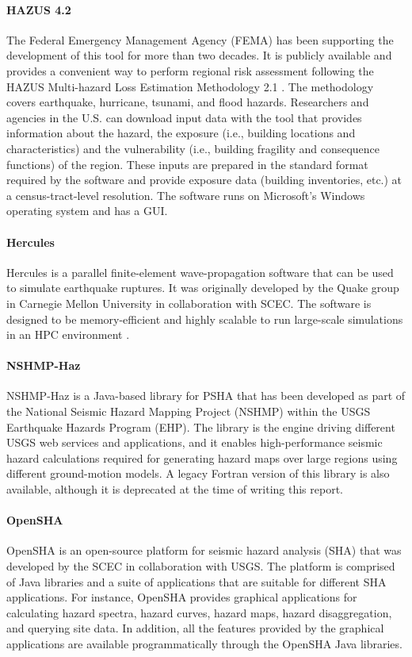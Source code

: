 \paragraph{HAZUS 4.2} The Federal Emergency Management Agency (FEMA) has been supporting the development of this tool for more than two decades. It is publicly available and provides a convenient way to perform regional risk assessment following the HAZUS Multi-hazard Loss Estimation Methodology 2.1 \citep{fema2011hurricanetechnical,fema2011earthquaketechnical,fema2011floodtechnical,fema2017tsunamitechnical}. The methodology covers earthquake, hurricane, tsunami, and flood hazards. Researchers and agencies in the U.S. can download input data with the tool that provides information about the hazard, the exposure (i.e., building locations and characteristics) and the vulnerability (i.e., building fragility and consequence functions) of the region. These inputs are prepared in the standard format required by the software and provide exposure data (building inventories, etc.) at a census-tract-level resolution. The software runs on Microsoft's Windows operating system and has a GUI.

\paragraph{Hercules} Hercules \citep{tu2006mesh} is a parallel finite-element wave-propagation software that can be used to simulate earthquake ruptures. It was originally developed by the Quake group in Carnegie Mellon University in collaboration with SCEC. The software is designed to be memory-efficient and highly scalable to run large-scale simulations in an HPC environment \citep{taborda2010speeding}. 

\paragraph{NSHMP-Haz} NSHMP-Haz is a Java-based library for PSHA that has been developed as part of the National Seismic Hazard Mapping Project (NSHMP) within the USGS Earthquake Hazards Program (EHP). The library is the engine driving different USGS web services and applications, and it enables high-performance seismic hazard calculations required for generating hazard maps over large regions using different ground-motion models. A legacy Fortran version of this library is also available, although it is deprecated at the time of writing this report.

\paragraph{OpenSHA} OpenSHA \citep{field2003opensha} is an open-source platform for seismic hazard analysis (SHA) that was developed by the SCEC in collaboration with USGS. The platform is comprised of Java libraries and a suite of applications that are suitable for different SHA applications. For instance, OpenSHA provides graphical applications for calculating hazard spectra, hazard curves, hazard maps, hazard disaggregation, and querying site data. In addition, all the features provided by the graphical applications are available programmatically through the OpenSHA Java libraries.

